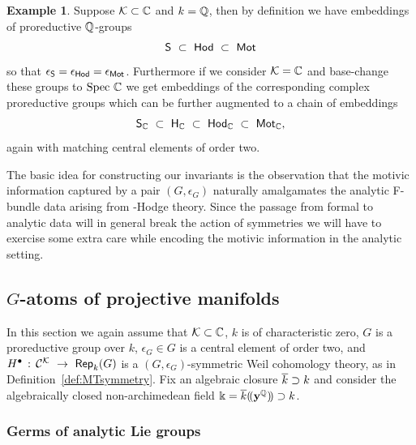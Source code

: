 \documentclass[twoside,leqno]{article}
\numberwithin{equation}{section}
\theoremstyle{plain}
\theoremstyle{definition}
\newtheorem{example}[equation]{Example}
\begin{document}
\begin{example} \label{ex:compareG} 
Suppose $\mathcal K \subset \mathbb C$ and $k = \mathbb Q$, then by definition we have embeddings of proreductive $\mathbb Q$-groups  
\[
\ztwogr \ \subset \ \hodge \ \subset \ \motM 
\]
so that $\epsilon_{\mathsf{S}} = \epsilon_{\mathsf{Hod}} = \epsilon_{\mathsf{Mot}}$. Furthermore if we consider 
$\mathcal K = \mathbb C$ and base-change these groups to $\operatorname{Spec} \, \mathbb C$  we get embeddings of the corresponding  complex proreductive groups 
which can be further augmented to a chain of embeddings 
\[
\mathsf{S}_{\mathbb C} \ \subset \ \mathsf{H}_{\mathbb C} \ \subset \ \mathsf{Hod}_{\mathbb C} \ \subset \ \mathsf{Mot}_{\mathbb C},
\]
again with matching central elements of order two.
\end{example}


The basic idea for constructing our invariants is the observation that the motivic information captured by a pair $(G,\epsilon_{G})$ naturally amalgamates the analytic F-bundle data arising from \nc-Hodge theory. Since the passage from formal to analytic data will in general break the action of symmetries we will have to exercise  some extra care while encoding the motivic information in the analytic setting.


\subsection{\texorpdfstring{$G$}{G}-atoms of projective manifolds} \label{sec:Gatoms_proj}

In this section we again assume that  $\mathcal K \subset \mathbb C$, $k$ is of characteristic zero, $G$ is a proreductive group over $k$, $\epsilon_{G} \in G$ is a central element of order two, and $H^{\bullet} \, : \, \CA{\kay} \ \to \ \mathsf{Rep}_{k}(G)$ is a $(G,\epsilon_{G})$-symmetric Weil cohomology theory, as in Definition~\ref{def:MTsymmetry}. Fix an algebraic closure $\overline{k} \supset k$ and consider  the algebraically closed non-archimedean field  $\Bbbk = \overline{k}(\!(\mathbf{y}^{\mathbb Q})\!) \supset k$.


\subsubsection{Germs of analytic Lie groups} \label{sss:germsG}
\end{document}

